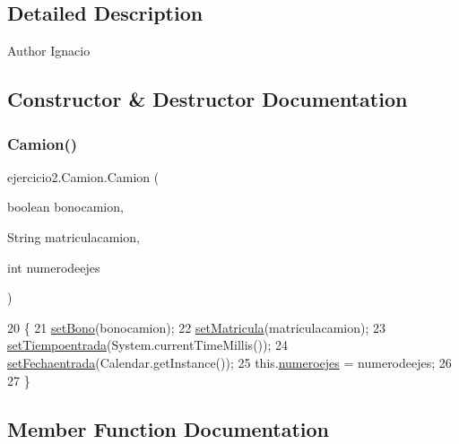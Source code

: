 \subsection{Detailed Description}
\begin{DoxyAuthor}{Author}
Ignacio 
\end{DoxyAuthor}


\subsection{Constructor \& Destructor Documentation}
\mbox{\label{classejercicio2_1_1_camion_a4bb6c2a4354fa219d24b61efedef7e1d}} 
\subsubsection{\texorpdfstring{Camion()}{Camion()}}
{\footnotesize\ttfamily ejercicio2.\+Camion.\+Camion (\begin{DoxyParamCaption}\item[{boolean}]{bonocamion,  }\item[{String}]{matriculacamion,  }\item[{int}]{numerodeejes }\end{DoxyParamCaption})\hspace{0.3cm}{\ttfamily [inline]}}


\begin{DoxyCode}
20                                                                                \{
21         \mbox{\hyperlink{classejercicio2_1_1_vehiculo_a10083fde68a5b3ef8698c76adba64ad7}{setBono}}(bonocamion);
22         \mbox{\hyperlink{classejercicio2_1_1_vehiculo_a839f602fe4695d9cb8d085bab398acd5}{setMatricula}}(matriculacamion);
23         \mbox{\hyperlink{classejercicio2_1_1_vehiculo_a021e05ca70b02df5ff40d48692beb6ba}{setTiempoentrada}}(System.currentTimeMillis());
24         \mbox{\hyperlink{classejercicio2_1_1_vehiculo_af87ce3fcfad1f20eb2fdbb87caaf6576}{setFechaentrada}}(Calendar.getInstance());
25         this.\mbox{\hyperlink{classejercicio2_1_1_camion_a212debf109984d9e6d453a0370bbad13}{numeroejes}} = numerodeejes;
26         
27     \}
\end{DoxyCode}


\subsection{Member Function Documentation}
\mbox{\label{classejercicio2_1_1_camion_ad182c3e62eaf039f0228bf8c7449da2e}} 

